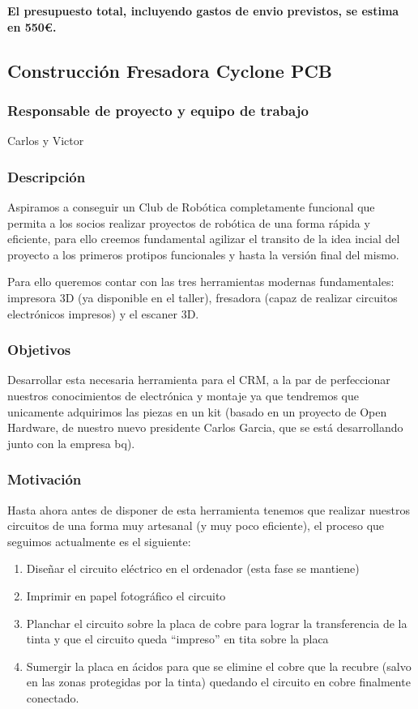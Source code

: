 \documentclass[12pt,twoside]{report}
\begin{document}
{\bf El presupuesto total, incluyendo gastos de envio previstos, se estima en 550\euro{}.}

\subsection{Construcción Fresadora Cyclone PCB}
\subsubsection{Responsable de proyecto y equipo de trabajo}
Carlos y Victor
\subsubsection{Descripción}
Aspiramos a conseguir un Club de Robótica completamente funcional que permita a los socios realizar proyectos de robótica de una forma rápida y eficiente, para ello creemos fundamental agilizar el transito de la idea incial del proyecto a los primeros protipos funcionales y hasta la versión final del mismo.

Para ello queremos contar con las tres herramientas modernas fundamentales: impresora 3D (ya disponible en el taller), fresadora (capaz de realizar circuitos electrónicos impresos) y el escaner 3D.

\subsubsection{Objetivos}
Desarrollar esta necesaria herramienta para el CRM, a la par de perfeccionar nuestros conocimientos de electrónica y montaje ya que tendremos que unicamente adquirimos las piezas en un kit (basado en un proyecto de Open Hardware, de nuestro nuevo presidente Carlos Garcia, que se está desarrollando junto con la empresa bq).
\subsubsection{Motivación}
Hasta ahora antes de disponer de esta herramienta tenemos que realizar nuestros circuitos de una forma muy artesanal (y muy poco eficiente), el proceso que seguimos actualmente es el siguiente:
\begin{enumerate}
\item Diseñar el circuito eléctrico en el ordenador (esta fase se mantiene)
\item Imprimir en papel fotográfico el circuito
\item Planchar el circuito sobre la placa de cobre para lograr la transferencia de la tinta y que el circuito queda “impreso” en tita sobre la placa
\item Sumergir la placa en ácidos para que se elimine el cobre que la recubre (salvo en las zonas protegidas por la tinta) quedando el circuito en cobre finalmente conectado.
\end{enumerate}
\end{document}

